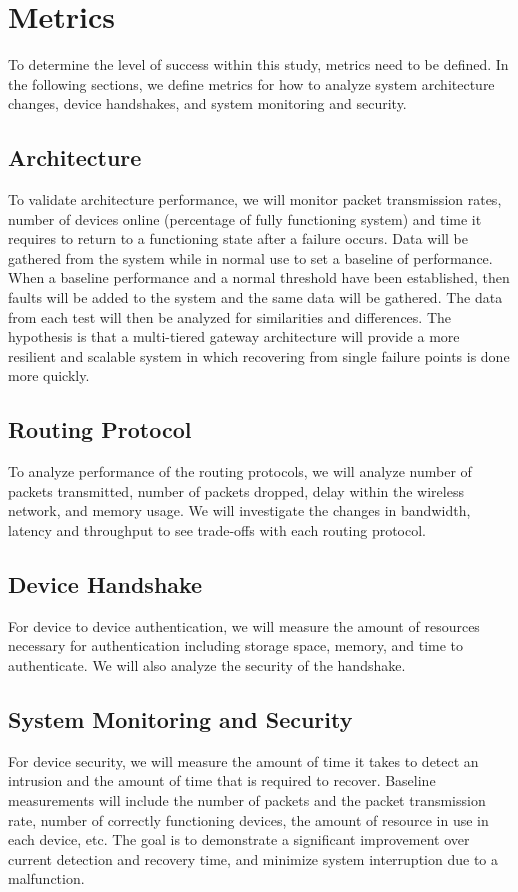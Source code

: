 \documentclass[../main.tex]{subfiles}
\begin{document}
\section{Metrics}

To determine the level of success within this study, metrics need to be defined. In the following sections, we define metrics for how to analyze system architecture changes, device handshakes, and system monitoring and security. 

\subsection{Architecture}
To validate architecture performance, we will monitor packet transmission rates, number of devices online (percentage of fully functioning system) and time it requires to return to a functioning state after a failure occurs. Data will be gathered from the system while in normal use to set a baseline of performance. When a baseline performance and a normal threshold have been established, then faults will be added to the system and the same data will be gathered. The data from each test will then be analyzed for similarities and differences. The hypothesis is that a multi-tiered gateway architecture will provide a more resilient and scalable system in which recovering from single failure points is done more quickly.

\subsection{Routing Protocol}
To analyze performance of the routing protocols, we will analyze number of packets transmitted, number of packets dropped, delay within the wireless network, and memory usage. We will investigate the changes in bandwidth, latency and throughput to see trade-offs with each routing protocol. 

\subsection{Device Handshake}
For device to device authentication, we will measure the amount of resources necessary for authentication including storage space, memory, and time to authenticate. We will also analyze the security of the handshake.

\subsection{System Monitoring and Security}
For device security, we will measure the amount of time it takes to detect an intrusion and the amount of time that is required to recover. Baseline measurements will include the number of packets and the packet transmission rate, number of correctly functioning devices, the amount of resource in use in each device, etc. The goal is to demonstrate a significant improvement over current detection and recovery time, and minimize system interruption due to a malfunction. 
\end{document}
